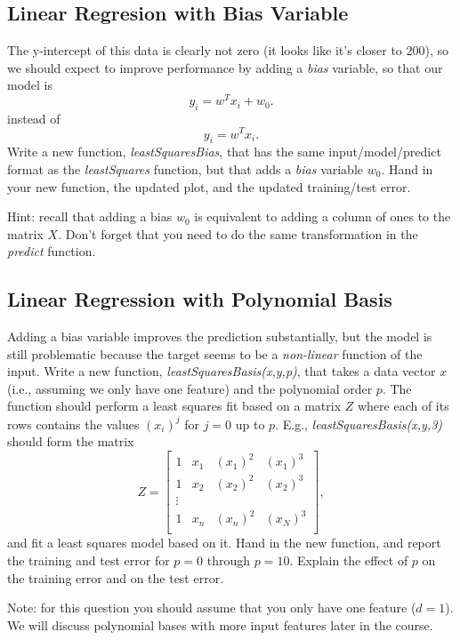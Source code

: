 \documentclass{article}
\def\blu#1{{\color{blu}#1}}
\begin{document}
\subsection{Linear Regresion with Bias Variable}

The y-intercept of this data is clearly not zero (it looks like it's closer to $200$), so we should expect to improve performance by adding a \emph{bias} variable, so that our model is
\[
y_i = w^Tx_i + w_0.
\]
instead of
\[
y_i = w^Tx_i.
\]
\blu{Write a new function, \emph{leastSquaresBias}, that has the same input/model/predict format as the \emph{leastSquares} function, but that adds a \emph{bias} variable $w_0$. Hand in your new function, the updated plot, and the updated training/test error.}

Hint: recall that adding a bias $w_0$ is equivalent to adding a column of ones to the matrix $X$. Don't forget that you need to do the same transformation in the \emph{predict} function.


\pagebreak

\subsection{Linear Regression with Polynomial Basis}

Adding a bias variable improves the prediction substantially, but the model is still problematic because the target seems to be a \emph{non-linear} function of the input. Write a new function, \emph{leastSquaresBasis(x,y,p)}, that takes a data vector $x$ (i.e., assuming we only have one feature) and the polynomial order $p$. The function should perform a least squares fit based on a matrix $Z$ where each of its rows contains the values $(x_{i})^j$ for $j=0$ up to $p$. E.g., \emph{leastSquaresBasis(x,y,3)} should form the matrix
\[
Z =
\left[\begin{array}{cccc}
1 & x_1 & (x_1)^2 & (x_1)^3\\
1 & x_2 & (x_2)^2 & (x_2)^3\\
\vdots\\
1 & x_n & (x_n)^2 & (x_N)^3\\
\end{array}
\right],
\]
and fit a least squares model based on it.
\blu{Hand in the new function, and report the training and test error for $p = 0$ through $p= 10$. Explain the effect of $p$ on the training error and on the test error.}

Note: for this question you should assume that you only have one feature ($d=1$). We will discuss polynomial bases with more input features later in the course.
\end{document}
